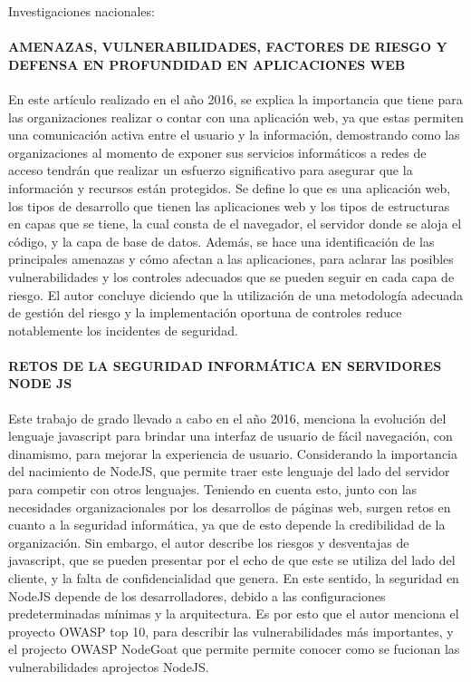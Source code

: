 Investigaciones nacionales:

\paragraph{AMENAZAS, VULNERABILIDADES, FACTORES DE RIESGO Y DEFENSA EN PROFUNDIDAD EN APLICACIONES WEB \cite{CarlosSerna} }
En este artículo realizado en el año 2016, se explica la importancia que tiene para las organizaciones realizar o contar con una aplicación web, ya que estas permiten una comunicación activa entre el usuario y la información, demostrando como las organizaciones al momento de exponer sus servicios informáticos a redes de acceso tendrán que realizar un esfuerzo significativo para asegurar que la información y recursos están protegidos. Se define lo que es una aplicación web, los tipos de desarrollo que tienen las aplicaciones web y los tipos de estructuras en capas que se tiene, la cual consta de el navegador, el servidor donde se aloja el código, y la capa de base de datos. Además, se hace una identificación de las principales amenazas y cómo afectan a las aplicaciones, para aclarar las posibles vulnerabilidades y los controles adecuados que se pueden seguir en cada capa de riesgo. El autor concluye diciendo que la utilización de una metodología adecuada de gestión del riesgo y la implementación oportuna de controles reduce notablemente los incidentes de seguridad.

\paragraph{RETOS DE LA SEGURIDAD INFORMÁTICA EN SERVIDORES NODE JS \cite{AriasMelo}}
Este trabajo de grado llevado a cabo en el año 2016, menciona la evolución del lenguaje javascript para brindar una interfaz de usuario de fácil navegación, con dinamismo, para mejorar la experiencia de usuario. Considerando la importancia del nacimiento de NodeJS, que permite traer este lenguaje del lado del servidor para competir con otros lenguajes. Teniendo en cuenta esto, junto con las necesidades organizacionales por los desarrollos de páginas web, surgen retos en cuanto a la seguridad informática, ya que de esto depende la credibilidad de la organización.
Sin embargo, el autor describe los riesgos y desventajas de javascript, que se pueden presentar por el echo de que este se utiliza del lado del cliente, y la falta de confidencialidad que genera. En este sentido, la seguridad en NodeJS depende de los desarrolladores, debido a las configuraciones predeterminadas mínimas y la arquitectura. Es por esto que el autor menciona el proyecto OWASP top 10, para describir las vulnerabilidades más importantes, y el projecto OWASP NodeGoat que permite permite conocer como se fucionan las vulnerabilidades aprojectos NodeJS.   


